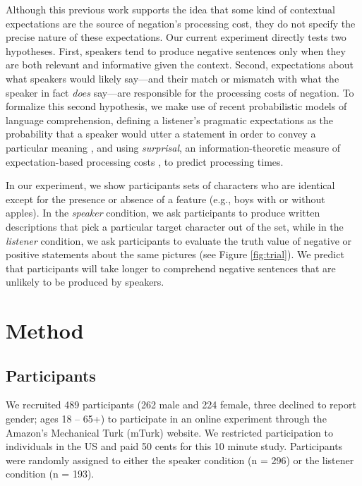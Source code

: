 \documentclass[man, noapacite]{apa2}
\begin{document}
Although this previous work supports the idea that some kind of contextual expectations are the source of negation's processing cost, they do not specify the precise nature of these expectations.  Our current experiment directly tests two hypotheses.  First, speakers tend to produce negative sentences only when they are both relevant and informative given the context.  Second, expectations about what speakers would likely say---and their match or mismatch with what the speaker in fact \emph{does} say---are responsible for the processing costs of negation. To formalize this second hypothesis, we make use of recent probabilistic models of language comprehension, defining a listener's pragmatic expectations as the probability that a speaker would utter a statement in order to convey a particular meaning \cite{frank2012}, and using \emph{surprisal}, an information-theoretic measure of expectation-based processing costs \cite{levy2008}, to predict processing times.  

In our experiment, we show participants sets of characters who are identical except for the presence or absence of a feature (e.g., boys with or without apples). In the \emph{speaker} condition, we ask participants to produce written descriptions that pick a particular target character out of the set, while in the \emph{listener} condition, we ask participants to evaluate the truth value of negative or positive statements about the same pictures (see Figure \ref{fig:trial}). We predict that participants will take longer to comprehend negative sentences that are unlikely to be produced by speakers.


\section{Method}

\subsection{Participants} 

We recruited 489 participants (262 male and 224 female, three declined to report gender; ages 18 -- 65+) to participate in an online experiment through the Amazon's Mechanical Turk (mTurk) website.  We restricted participation to individuals in the US and paid 50 cents for this 10 minute study.  Participants were randomly assigned to either the speaker condition (n = 296) or the listener condition (n = 193).
\end{document}
